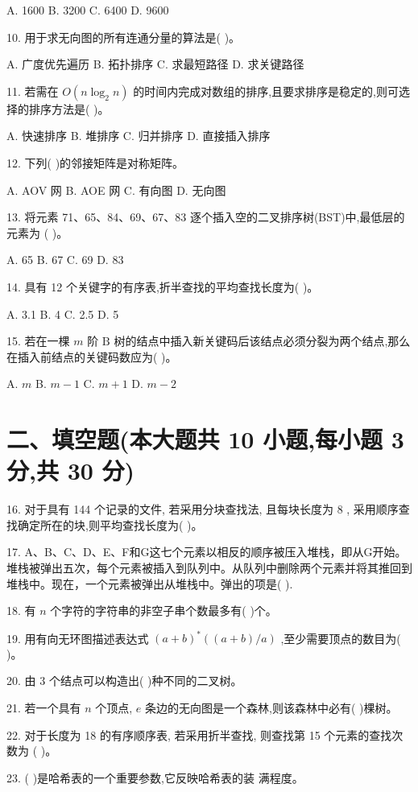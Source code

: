A. 1600 B. 3200 C. 6400 D. 9600

10. 用于求无向图的所有连通分量的算法是(   )。

A. 广度优先遍历 B. 拓扑排序 C. 求最短路径 D. 求关键路径

11. 若需在 \(O\left( {n{\log }_{2}n}\right)\) 的时间内完成对数组的排序,且要求排序是稳定的,则可选择的排序方法是(   )。

A. 快速排序 B. 堆排序 C. 归并排序 D. 直接插入排序

12. 下列(   )的邻接矩阵是对称矩阵。

A. AOV 网 B. AOE 网 C. 有向图 D. 无向图

13. 将元素 71、65、84、69、67、83 逐个插入空的二叉排序树(BST)中,最低层的元素为 (   )。

A. 65 B. 67 C. 69 D. 83

14. 具有 12 个关键字的有序表,折半查找的平均查找长度为(   )。

A. 3.1 B. 4 C. 2.5 D. 5

15. 若在一棵 \(m\) 阶 \(\mathrm{B}\) 树的结点中插入新关键码后该结点必须分裂为两个结点,那么在插入前结点的关键码数应为(   )。

A. \(m\) B. \(m - 1\) C. \(m + 1\) D. \(m - 2\)

\section*{二、填空题(本大题共 10 小题,每小题 3 分,共 30 分)}

16. 对于具有 144 个记录的文件, 若采用分块查找法, 且每块长度为 8 , 采用顺序查找确定所在的块,则平均查找长度为(   )。

17. A、B、C、D、E、F和G这七个元素以相反的顺序被压入堆栈，即从G开始。堆栈被弹出五次，每个元素被插入到队列中。从队列中删除两个元素并将其推回到堆栈中。现在，一个元素被弹出从堆栈中。弹出的项是(   ).

18. 有 \(n\) 个字符的字符串的非空子串个数最多有(   )个。

19. 用有向无环图描述表达式 \({\left( a + b\right) }^{ * }\left( {\left( {a + b}\right) /a}\right)\) ,至少需要顶点的数目为(   )。

20. 由 3 个结点可以构造出(   )种不同的二叉树。

21. 若一个具有 \(n\) 个顶点, \(e\) 条边的无向图是一个森林,则该森林中必有(   )棵树。

22. 对于长度为 18 的有序顺序表, 若采用折半查找, 则查找第 15 个元素的查找次数为 (   )。

23. (   )是哈希表的一个重要参数,它反映哈希表的装 满程度。

